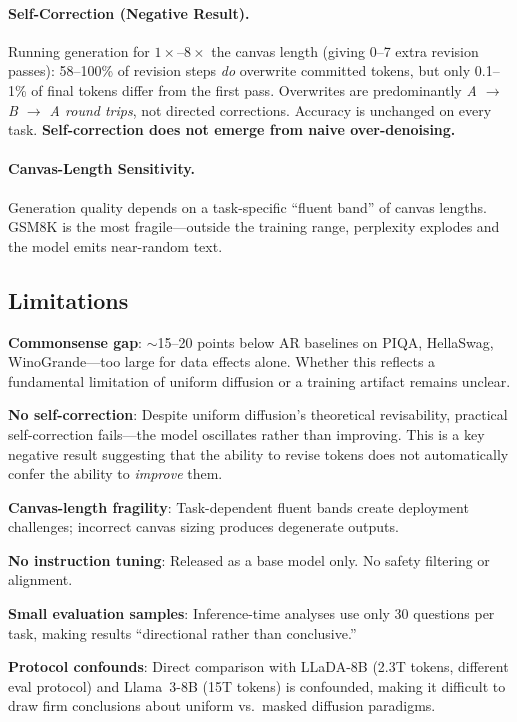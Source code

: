 \documentclass[11pt,a4paper]{article}
\begin{document}
\paragraph{Self-Correction (Negative Result).} Running generation for $1\times$--$8\times$ the canvas length (giving 0--7 extra revision passes): 58--100\% of revision steps \emph{do} overwrite committed tokens, but only 0.1--1\% of final tokens differ from the first pass. Overwrites are predominantly \emph{A $\to$ B $\to$ A round trips}, not directed corrections. Accuracy is unchanged on every task. \textbf{Self-correction does not emerge from naive over-denoising.}

\paragraph{Canvas-Length Sensitivity.} Generation quality depends on a task-specific ``fluent band'' of canvas lengths. GSM8K is the most fragile---outside the training range, perplexity explodes and the model emits near-random text.

\subsection{Limitations}

\textbf{Commonsense gap}: $\sim$15--20 points below AR baselines on PIQA, HellaSwag, WinoGrande---too large for data effects alone. Whether this reflects a fundamental limitation of uniform diffusion or a training artifact remains unclear.

\textbf{No self-correction}: Despite uniform diffusion's theoretical revisability, practical self-correction fails---the model oscillates rather than improving. This is a key negative result suggesting that the ability to revise tokens does not automatically confer the ability to \emph{improve} them.

\textbf{Canvas-length fragility}: Task-dependent fluent bands create deployment challenges; incorrect canvas sizing produces degenerate outputs.

\textbf{No instruction tuning}: Released as a base model only. No safety filtering or alignment.

\textbf{Small evaluation samples}: Inference-time analyses use only 30 questions per task, making results ``directional rather than conclusive.''

\textbf{Protocol confounds}: Direct comparison with LLaDA-8B (2.3T tokens, different eval protocol) and Llama~3-8B (15T tokens) is confounded, making it difficult to draw firm conclusions about uniform vs.\ masked diffusion paradigms.
\end{document}
